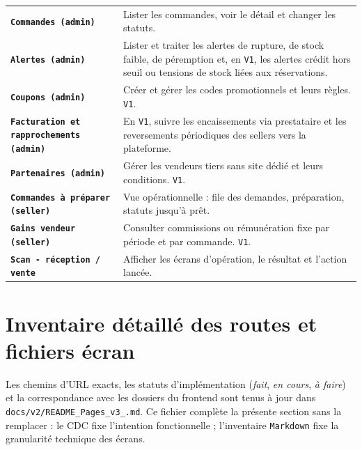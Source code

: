 \documentclass[11pt,a4paper]{scrreprt}
\newcommand{\code}[1]{\texttt{#1}}
\begin{document}
\begin{longtable}{>{\bfseries}p{4.1cm}p{10.1cm}}
\code{Commandes (admin)} & Lister les commandes, voir le détail et changer les statuts. \\
\code{Alertes (admin)} & Lister et traiter les alertes de rupture, de stock faible, de péremption et, en \code{V1}, les alertes crédit hors seuil ou tensions de stock liées aux réservations. \\
\code{Coupons (admin)} & Créer et gérer les codes promotionnels et leurs règles. \code{V1}. \\
\code{Facturation et rapprochements (admin)} & En \code{V1}, suivre les encaissements via prestataire et les reversements périodiques des sellers vers la plateforme. \\
\code{Partenaires (admin)} & Gérer les vendeurs tiers sans site dédié et leurs conditions. \code{V1}. \\
\code{Commandes à préparer (seller)} & Vue opérationnelle : file des demandes, préparation, statuts jusqu'à prêt. \\
\code{Gains vendeur (seller)} & Consulter commissions ou rémunération fixe par période et par commande. \code{V1}. \\
\code{Scan - réception / vente} & Afficher les écrans d'opération, le résultat et l'action lancée. \\
\bottomrule
\end{longtable}

\section{Inventaire détaillé des routes et fichiers écran}
Les chemins d'URL exacts, les statuts d'implémentation (\emph{fait}, \emph{en cours}, \emph{à faire}) et la correspondance avec les dossiers du frontend sont tenus à jour dans \code{docs/v2/README\_Pages\_v3\_.md}. Ce fichier complète la présente section sans la remplacer : le CDC fixe l'intention fonctionnelle ; l'inventaire \code{Markdown} fixe la granularité technique des écrans.
\end{document}
